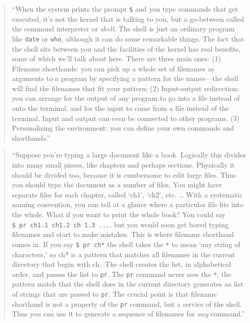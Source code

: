 \documentclass[]{tufte-book}
\begin{document}
\begin{quote}
``When the system prints the prompt \texttt{\$} and you type commands that get
executed, it's not the kernel that is talking to you, but a go-between called
the command interpreter or \emph{shell}. The shell is just an ordinary program like
\texttt{date} or \texttt{who}, although it can do some remarkable things. The fact that the shell
sits between you and the facilities of the kernel has real benefits, some of which
we'll talk about here. There are three main ones: (1) Filename shorthands: you can
pick up a whole set of filenames as arguments to a program by specifying a
pattern for the names---the shell will find the filenames that fit your pattern;
(2) Input-output redirection: you can arrange for the output of any program to
go into a file instead of onto the terminal, and for the input to come from
a file instead of the terminal. Input and output can even be connected to
other programs. (3) Personalizing the environment: you can define your own
commands and shorthands.'' \citep{kernighan1984unix}
\end{quote}

\begin{quote}
``Suppose you're typing a large document like a book. Logically this divides into many small pieces,
like chapters and perhaps sections. Physically it should be divided too, because it is cumbersome
to edit large files. Thus you should type the document as a number of files. You might have separate
files for each chapter, called `ch1', `ch2', etc. \ldots{} With a systematic naming convention, you can tell at
a glance where a particular file fits into the whole. What if you want to print the whole book? You could
say \texttt{\$\ pr\ ch1.1\ ch1.2\ ch\ 1.3\ ...}, but you would soon get bored typing filenames and start to make mistakes.
This is where filename shorthand comes in. If you say \texttt{\$\ pr\ ch*} the shell takes the \texttt{*} to mean `any
string of characters,' so ch* is a pattern that matches all filenames in the current directory that
begin with ch.~The shell creates the list, in alphabetical order, and passes the list to \texttt{pr}. The
\texttt{pr} command never sees the \texttt{*}; the pattern match that the shell does in the current directory
generates aa list of strings that are passed to \texttt{pr}. The crucial point is that filename shorthand
is not a property of the \texttt{pr} command, but a service of the shell. Thus you can use it to generate
a sequence of filenames for \emph{any} command.'' \citep{kernighan1984unix}
\end{quote}
\end{document}
